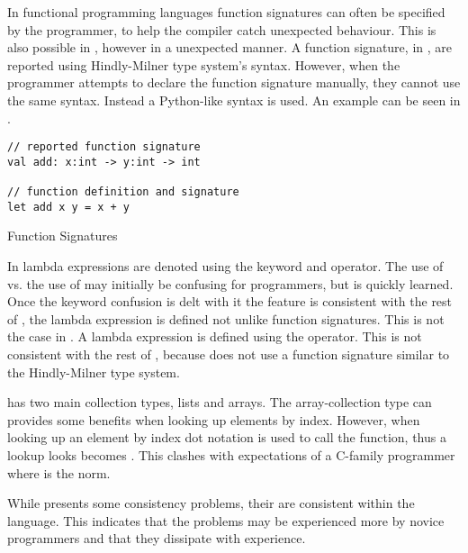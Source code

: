 In functional programming languages function signatures can often be specified by the programmer, to help the compiler catch unexpected behaviour. This is also possible in \fs, however in a unexpected manner. A function signature, in \fs, are reported using Hindly-Milner type system's syntax. However, when the programmer attempts to declare the function signature manually, they cannot use the same syntax. Instead a Python-like syntax is used. An example can be seen in .

\begin{listing}[H]
\begin{verbatim}
// reported function signature
val add: x:int -> y:int -> int

// function definition and signature
let add x y = x + y
\end{verbatim}
\caption{Function Signatures}
\label{lst:fun-sig}
\end{listing}

In \fs lambda expressions are denoted using the  keyword and \fsinline{->} operator. The use of  vs. the use of  may initially be confusing for programmers, but is quickly learned. Once the keyword confusion is delt with it the feature is consistent with the rest of \fs, the lambda expression is defined not unlike function signatures. This is not the case in \cs. A lambda expression is defined using the \csinline{=>} operator. This is not consistent with the rest of \cs, because \cs does not use a function signature similar to the Hindly-Milner type system.

\fs has two main collection types, lists and arrays. The array-collection type can provides some benefits when looking up elements by index.  However, when looking up an element by index dot notation is used to call the \fsinline{[]} function, thus a lookup looks becomes . This clashes with expectations of a C-family programmer where  is the norm.

While \fs presents some consistency problems, their are consistent within the language. This indicates that the problems may be experienced more by novice programmers and that they dissipate with experience.

